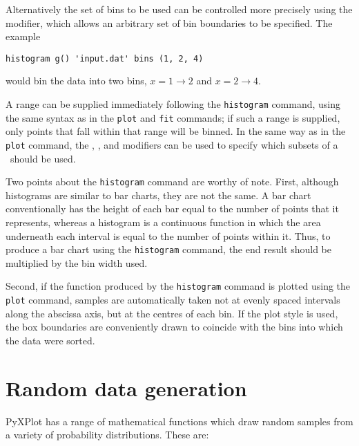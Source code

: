 Alternatively the set of bins to be used can be controlled more precisely using
the  modifier, which allows an arbitrary set of bin boundaries to
be specified. The example

\begin{verbatim}
histogram g() 'input.dat' bins (1, 2, 4)
\end{verbatim}

\noindent would bin the data into two bins, $x=1\to 2$ and $x=2\to 4$.

A range can be supplied immediately following the {\tt histogram} command,
using the same syntax as in the {\tt plot} and {\tt fit} commands; if such a
range is supplied, only points that fall within that range will be binned.  In
the same way as in the {\tt plot} command, the ,
,  and  modifiers can be used to
specify which subsets of a \datafile\ should be used.

Two points about the {\tt histogram} command are worthy of note. First,
although histograms are similar to bar charts, they are not the same.  A bar
chart conventionally has the height of each bar equal to the number of points
that it represents, whereas a histogram is a continuous function in which the
area underneath each interval is equal to the number of points within it.
Thus, to produce a bar chart using the {\tt histogram} command, the end result
should be multiplied by the bin width used.

Second, if the function produced by the {\tt histogram} command is plotted
using the {\tt plot} command, samples are automatically taken not at evenly
spaced intervals along the abscissa axis, but at the centres of each bin. If
the  plot style is used, the box boundaries are conveniently
drawn to coincide with the bins into which the data were sorted.

\section{Random data generation}

PyXPlot has a range of mathematical functions which draw random samples from a
variety of probability distributions. These are:

